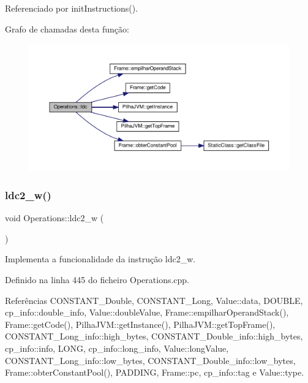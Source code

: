 Referenciado por init\+Instructions().

Grafo de chamadas desta função\+:
\nopagebreak
\begin{figure}[H]
\begin{center}
\leavevmode
\includegraphics[width=350pt]{classOperations_aa9a87c1ef4605d0b7b7a99c8d9bc693c_cgraph}
\end{center}
\end{figure}
\mbox{\label{classOperations_ae5f11d6a8ea22b30f316c47af914f05a}} 
\subsubsection{\texorpdfstring{ldc2\+\_\+w()}{ldc2\_w()}}
{\footnotesize\ttfamily void Operations\+::ldc2\+\_\+w (\begin{DoxyParamCaption}{ }\end{DoxyParamCaption})\hspace{0.3cm}{\ttfamily [private]}}



Implementa a funcionalidade da instrução ldc2\+\_\+w. 



Definido na linha 445 do ficheiro Operations.\+cpp.



Referências C\+O\+N\+S\+T\+A\+N\+T\+\_\+\+Double, C\+O\+N\+S\+T\+A\+N\+T\+\_\+\+Long, Value\+::data, D\+O\+U\+B\+LE, cp\+\_\+info\+::double\+\_\+info, Value\+::double\+Value, Frame\+::empilhar\+Operand\+Stack(), Frame\+::get\+Code(), Pilha\+J\+V\+M\+::get\+Instance(), Pilha\+J\+V\+M\+::get\+Top\+Frame(), C\+O\+N\+S\+T\+A\+N\+T\+\_\+\+Long\+\_\+info\+::high\+\_\+bytes, C\+O\+N\+S\+T\+A\+N\+T\+\_\+\+Double\+\_\+info\+::high\+\_\+bytes, cp\+\_\+info\+::info, L\+O\+NG, cp\+\_\+info\+::long\+\_\+info, Value\+::long\+Value, C\+O\+N\+S\+T\+A\+N\+T\+\_\+\+Long\+\_\+info\+::low\+\_\+bytes, C\+O\+N\+S\+T\+A\+N\+T\+\_\+\+Double\+\_\+info\+::low\+\_\+bytes, Frame\+::obter\+Constant\+Pool(), P\+A\+D\+D\+I\+NG, Frame\+::pc, cp\+\_\+info\+::tag e Value\+::type.



